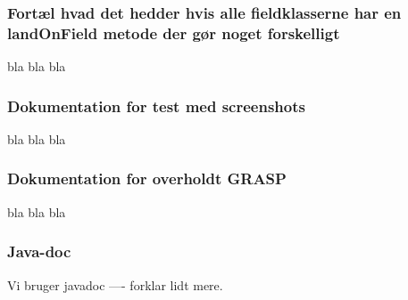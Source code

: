\subsubsection{Fortæl hvad det hedder hvis alle fieldklasserne har en landOnField metode der gør noget forskelligt}
bla bla bla

\subsubsection{Dokumentation for test med screenshots}
bla bla bla

\subsubsection{Dokumentation for overholdt GRASP}
bla bla bla

\subsubsection{Java-doc}
Vi bruger javadoc ---- forklar lidt mere.